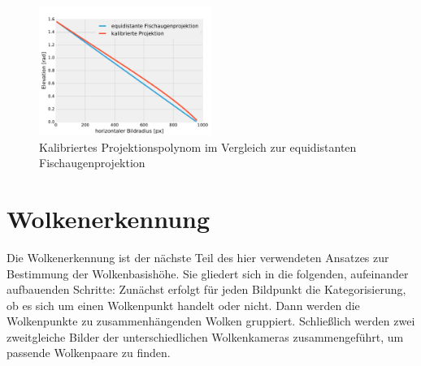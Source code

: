 \documentclass[a4paper,11pt,twoside,german]{article}
\begin{document}
\begin{figure}[!h]
\begin{center}
\vspace{-0.7cm}
\includegraphics[width=0.5\textwidth]{media/projection-calibration.pdf}
\vspace{-0.7cm}
\caption[Kalibrierte Projektionsfunktion]{Kalibriertes Projektionspolynom im
Vergleich zur equidistanten Fischaugenprojektion}
\label{FIGProjektioncalib}
\end{center}
\end{figure}


\section{Wolkenerkennung}
\label{SECWolkenErkennung}
Die Wolkenerkennung ist der nächste Teil des hier verwendeten Ansatzes zur
Bestimmung der Wolkenbasishöhe. Sie gliedert sich in die folgenden, aufeinander
aufbauenden Schritte: Zunächst erfolgt für jeden Bildpunkt die Kategorisierung,
ob es sich um einen Wolkenpunkt handelt oder nicht.  Dann werden die
Wolkenpunkte zu zusammenhängenden Wolken gruppiert. Schließlich werden zwei
zweitgleiche Bilder der unterschiedlichen Wolkenkameras zusammengeführt, um
passende Wolkenpaare zu finden. 
\end{document}
